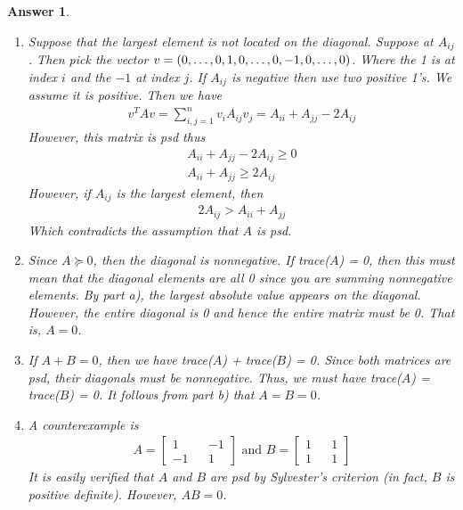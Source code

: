 \documentclass[12pt]{article}
\theoremstyle{colon}
\newtheorem*{answer}{Answer}
\begin{document}
\begin{answer}
  \leavevmode
  \begin{enumerate}[label=\alph*)]
    \item Suppose that the largest element is not located on the diagonal. Suppose at $A_{ij}$. Then pick the vector $v = (0,\mathellipsis,0,1,0,\mathellipsis,0,-1,0,\mathellipsis,0)$. Where the 1 is at index $i$ and the $-1$ at index $j$. If $A_{ij}$ is negative then use two positive 1's. We assume it is positive. Then we have
    \begin{gather*}
      v^T A v = \sum_{i,j = 1}^n v_i A_{ij} v_j = A_{ii} + A_{jj} - 2A_{ij}
    \end{gather*}
    However, this matrix is psd thus
    \begin{gather*}
      A_{ii} + A_{jj} - 2A_{ij} \geq 0 \\
      A_{ii} + A_{jj} \geq 2 A_{ij}
    \end{gather*}
    However, if $A_{ij}$ is the largest element, then
    \begin{gather*}
      2 A_{ij} > A_{ii} + A_{jj}
    \end{gather*}
    Which contradicts the assumption that $A$ is psd.

    \item Since $A \succeq 0$, then the diagonal is nonnegative. If trace($A$) = 0, then this must mean that the diagonal elements are all 0 since you are summing nonnegative elements. By part a), the largest absolute value appears on the diagonal. However, the entire diagonal is 0 and hence the entire matrix must be 0. That is, $A = 0$.

    \item If $A + B = 0$, then we have trace($A$) + trace($B$) = 0. Since both matrices are psd, their diagonals must be nonnegative. Thus, we must have trace($A$) = trace($B$) = 0. It follows from part b) that $A = B = 0$.

    \item A counterexample is
      \begin{gather*}
        A = \begin{bmatrix}
          1 && -1 \\
          -1 && 1
        \end{bmatrix} \text{ and } B = \begin{bmatrix}
          1 && 1 \\
          1 && 1
        \end{bmatrix}
      \end{gather*}
      It is easily verified that $A$ and $B$ are psd by Sylvester's criterion (in fact, $B$ is positive definite). However, $AB = 0$.
  \end{enumerate}
\end{answer}
\end{document}
